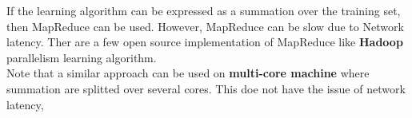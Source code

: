 \documentclass[a4paper,12pt]{report}
\begin{document}
If the learning algorithm can be expressed as a summation over the training set, then MapReduce can be used. However, MapReduce can be slow due to Network latency. Ther are a few open source implementation of MapReduce like \textbf{Hadoop} parallelism learning algorithm.\\
Note that a similar approach can be used on \textbf{multi-core machine} where summation are splitted over several cores. This doe not have the issue of network latency,
\end{document}
